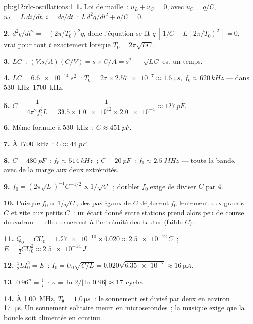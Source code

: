 \begin{solution}{pb:g12:rlc-oscillations:1}
\textbf{1.} Loi de maille~: $u_L + u_C = 0$, avec $u_C = q/C$,
$u_L = L\,di/dt$, $i = dq/dt$~: $L\,d^2q/dt^2 + q/C = 0$.

\textbf{2.} $d^2q/dt^2 = -(2\pi/T_0)^2 q$, donc l'équation se lit
$q\,[\,1/C - L(2\pi/T_0)^2\,] = 0$, vrai pour tout $t$ exactement
lorsque $T_0 = 2\pi\sqrt{LC}$.

\textbf{3.} $LC$~: $(\unit{V.s/A})(\unit{C/V}) = \unit{s} \times
\unit{C/A} = \unit{s^2}$ --- $\sqrt{LC}$ est un temps.

\textbf{4.} $LC = \qty{6.6e-14}{s^2}$~: $T_0 = 2\pi \times \num{2.57e-7}
\approx \qty{1.6}{\micro s}$, $f_0 \approx \qty{620}{kHz}$ --- dans
\qtyrange{530}{1700}{kHz}.

\textbf{5.} $C = \dfrac{1}{4\pi^2 f_0^2 L} = \dfrac{1}{39.5 \times
\num{1.0e12} \times \num{2.0e-4}} \approx \qty{127}{pF}$.

\textbf{6.} Même formule à \qty{530}{kHz}~: $C \approx \qty{451}{pF}$.

\textbf{7.} À \qty{1700}{kHz}~: $C \approx \qty{44}{pF}$.

\textbf{8.} $C = \qty{480}{pF}$~: $f_0 \approx \qty{514}{kHz}$~;
$C = \qty{20}{pF}$~: $f_0 \approx \qty{2.5}{MHz}$ --- toute la bande,
avec de la marge aux deux extrémités.

\textbf{9.} $f_0 = (2\pi\sqrt{L})^{-1}C^{-1/2} \propto 1/\sqrt{C}$~;
doubler $f_0$ exige de diviser $C$ par $4$.

\textbf{10.} Puisque $f_0 \propto 1/\sqrt{C}$, des pas égaux de $C$
déplacent $f_0$ lentement aux grands $C$ et vite aux petits $C$~: un
écart donné entre stations prend alors peu de course de cadran ---
elles se serrent à l'extrémité des
hautes  (faible $C$).

\textbf{11.} $Q_0 = CU_0 = \num{1.27e-10} \times 0.020 \approx
\qty{2.5e-12}{C}$~; $E = \tfrac12 CU_0^2 \approx \qty{2.5e-14}{J}$.

\textbf{12.} $\tfrac12 LI_0^2 = E$~: $I_0 = U_0\sqrt{C/L} =
0.020\sqrt{\num{6.35e-7}} \approx \qty{16}{\micro A}$.

\textbf{13.} $0.96^n = \tfrac12$~: $n = \ln 2/\lvert\ln 0.96\rvert
\approx 17$~cycles.

\textbf{14.} À \qty{1.00}{MHz}, $T_0 = \qty{1.0}{\micro s}$~: le
sonnement est divisé par deux en environ \qty{17}{\micro s}. Un
sonnement solitaire meurt en microsecondes~; la musique exige que la
boucle soit alimentée en continu.


\end{solution}
